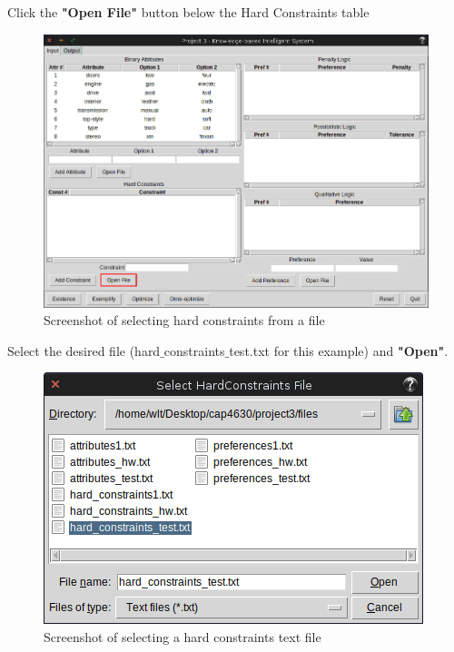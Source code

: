 \documentclass[12pt]{report}
\begin{document}
\begin{description}[leftmargin=4em]
\item [Step 1:] Click the \textbf{"Open File"} button below the Hard Constraints table
\begin{figure}[H]
\begin{center}
\includegraphics[scale=0.3,trim=1cm 1cm 1cm 1cm]{input_constraints}
\caption{Screenshot of selecting hard constraints from a file}
\end{center}
\end{figure}
\vspace{-2.5em}
\item [Step 2:] Select the desired file (hard$\_$constraints$\_$test.txt for this example) and \textbf{"Open"}.
\begin{figure}[H]
\begin{center}
\includegraphics[scale=0.3,trim=1cm 1cm 1cm 1cm]{select_constraints}
\caption{Screenshot of selecting a hard constraints text file}
\end{center}

\end{figure}
\end{description}
\end{document}
